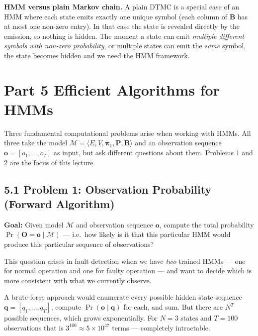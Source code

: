 \documentclass[12pt, a4paper]{article}
\begin{document}
\begin{notebox}
  \textbf{HMM versus plain Markov chain.}
  A plain DTMC is a special case of an HMM where each state emits exactly
  one unique symbol (each column of $\mathbf{B}$ has at most one non-zero
  entry). In that case the state is revealed directly by the emission, so
  nothing is hidden. The moment a state can emit \emph{multiple different
  symbols with non-zero probability}, or multiple states can emit the
  \emph{same} symbol, the state becomes hidden and we need the HMM framework.
\end{notebox}

\section*{Part 5 \quad Efficient Algorithms for HMMs}

Three fundamental computational problems arise when working with HMMs.
All three take the model $\mathcal{M} = \langle E, V, \boldsymbol{\pi}_1,
\mathbf{P}, \mathbf{B} \rangle$ and an observation sequence $\mathbf{o} =
[o_1, \ldots, o_T]$ as input, but ask different questions about them.
Problems 1 and 2 are the focus of this lecture.

\subsection*{5.1 \quad Problem 1: Observation Probability (Forward Algorithm)}

\textbf{Goal:} Given model $\mathcal{M}$ and observation sequence $\mathbf{o}$,
compute the total probability $\Pr(\mathbf{O} = \mathbf{o} \mid \mathcal{M})$
--- i.e.\ how likely is it that this particular HMM would produce this
particular sequence of observations?

This question arises in fault detection when we have \emph{two} trained HMMs
--- one for normal operation and one for faulty operation --- and want to decide
which is more consistent with what we currently observe.

A brute-force approach would enumerate every possible hidden state sequence
$\mathbf{q} = [q_1, \ldots, q_T]$, compute $\Pr(\mathbf{o} \mid \mathbf{q})$
for each, and sum. But there are $N^T$ possible sequences, which grows
exponentially. For $N=3$ states and $T=100$ observations that is
$3^{100} \approx 5 \times 10^{47}$ terms --- completely intractable.
\end{document}
